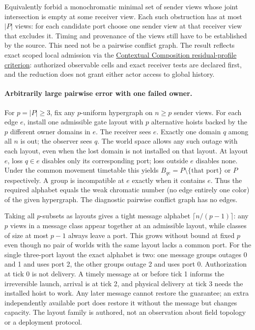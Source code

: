 \documentclass[11pt]{article}
\begin{document}
Equivalently forbid a monochromatic minimal set of sender views whose joint intersection is empty at some receiver view. Each such obstruction has at most $|P|$ views: for each candidate port choose one sender view at that receiver view that excludes it. Timing and provenance of the views still have to be established by the source. This need not be a pairwise conflict graph. The result reflects exact scoped local admission via the \href{https://github.com/eternal-november/eos-research-programmes/blob/e396e54d31567ae10f7f61cfa6f33f9b63f5777e/projects/contextual-composition/feedback-and-concurrency/observable-covers/Residual_Profiles_and_Admission_Reflection.tex}{Contextual Composition residual-profile criterion}: authorized observable cells and exact receiver tests are declared first, and the reduction does not grant either actor access to global history.

\paragraph{Arbitrarily large pairwise error with one failed owner.}
For $p=|P|\ge3$, fix any $p$-uniform hypergraph on $n\ge p$ sender views. For each edge $e$, install one admissible gate layout with $p$ alternative hoists backed by the $p$ different owner domains in $e$. The receiver sees $e$. Exactly one domain $q$ among all $n$ is out; the observer sees $q$. The world space allows any such outage with each layout, even when the lost domain is not installed on that layout. At layout $e$, loss $q\in e$ disables only its corresponding port; loss outside $e$ disables none. Under the common movement timetable this yields $B_{qe}=P\setminus\{\text{that port}\}$ or $P$ respectively. A group is incompatible at $e$ exactly when it contains $e$. Thus the required alphabet equals the weak chromatic number (no edge entirely one color) of the given hypergraph. The diagnostic pairwise conflict graph has no edges.

Taking all $p$-subsets as layouts gives a tight message alphabet $\lceil n/(p-1)\rceil$: any $p$ views in a message class appear together at an admissible layout, while classes of size at most $p-1$ always leave a port. This grows without bound at fixed $p$ even though no pair of worlds with the same layout lacks a common port. For the single three-port layout the exact alphabet is two: one message groups outages 0 and 1 and uses port 2, the other groups outage 2 and uses port 0. Authorization at tick 0 is not delivery. A timely message at or before tick 1 informs the irreversible launch, arrival is at tick 2, and physical delivery at tick 3 needs the installed hoist to work. Any later message cannot restore the guarantee; an extra independently available port does restore it without the message but changes capacity. The layout family is authored, not an observation about field topology or a deployment protocol.
\end{document}
